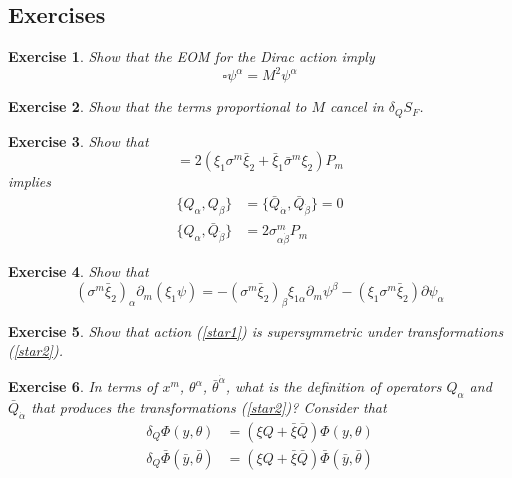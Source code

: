 \documentclass[a4paper,12pt]{article}
\newtheorem{exe}{Exercise}
\numberwithin{equation}{section}
\numberwithin{exe}{section}
\newcommand{\p}{{\partial}}
\renewcommand{\a}{{\alpha}}
\newcommand{\ad}{{\dot\alpha}}
\renewcommand{\b}{{\beta}}
\newcommand{\bd}{{\dot\beta}}
\renewcommand{\d}{{\delta}}
\newcommand{\s}{{\sigma}}
\renewcommand{\sb}{{\bar\sigma}}
\renewcommand{\t}{{\theta}}
\newcommand{\tb}{{\bar\theta}}
\newcommand{\xib}{{\bar\xi}}
\begin{document}
\subsection{Exercises}

	\begin{exe}
	Show that the EOM for the Dirac action imply
		\begin{equation}
		\square \psi^\a = M^2 \psi^\a
		\end{equation}
	\end{exe}

	\begin{exe}
	Show that the terms proportional to $M$ cancel in $\d_Q S_F$.
	\end{exe}

	\begin{exe}
	Show that
		\begin{equation}
		[\xi_1 Q + \xib_1 \bar Q, \xi_2 Q + \xib_2 \bar Q] = 2(\xi_1 \s^m \xib_2 + \xib_1 \sb^m \xi_2) P_m
		\end{equation}
	implies
		\begin{align}
		\{Q_\a, Q_\b \} & = \{\bar Q_\ad, \bar Q_\bd \} = 0 \\
		\{Q_\a, \bar Q_\bd\} & = 2 \s^m_{\a\bd} P_m
		\end{align}
	\end{exe}

	\begin{exe}
	Show that
		\begin{equation}
		(\s^m \xib_2)_\a \p_m (\xi_1 \psi) = - (\s^m \xib_2)_\b \xi_{1\a} \p_m \psi^\b - (\xi_1 \s^m \xib_2)\p \psi_\a
		\end{equation}
	\end{exe}

	\begin{exe}
	Show that action (\ref{star1}) is supersymmetric under transformations (\ref{star2}).
	\end{exe}

	\begin{exe}
	In terms of $x^m$, $\t^\a$, $\tb^\ad$, what is the definition of operators $Q_\a$ and $\bar Q_\ad$ that produces the transformations (\ref{star2})? Consider that
		\begin{align}
		\d_Q\Phi(y,\t) & = (\xi Q + \xib \bar Q) \Phi(y,\t) \\
		\d_Q\bar\Phi(\bar y, \tb) & = (\xi Q + \xib \bar Q) \bar\Phi(\bar y, \tb)
		\end{align}
	\end{exe}
\end{document}
